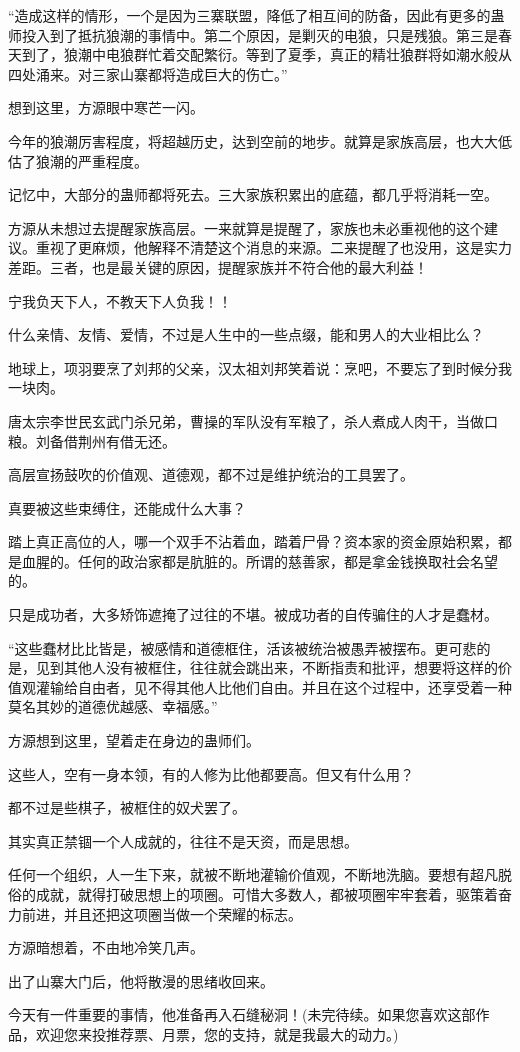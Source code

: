 \begin{this_body}
“造成这样的情形，一个是因为三寨联盟，降低了相互间的防备，因此有更多的蛊师投入到了抵抗狼潮的事情中。第二个原因，是剿灭的电狼，只是残狼。第三是春天到了，狼潮中电狼群忙着交配繁衍。等到了夏季，真正的精壮狼群将如潮水般从四处涌来。对三家山寨都将造成巨大的伤亡。”

想到这里，方源眼中寒芒一闪。

今年的狼潮厉害程度，将超越历史，达到空前的地步。就算是家族高层，也大大低估了狼潮的严重程度。

记忆中，大部分的蛊师都将死去。三大家族积累出的底蕴，都几乎将消耗一空。

方源从未想过去提醒家族高层。一来就算是提醒了，家族也未必重视他的这个建议。重视了更麻烦，他解释不清楚这个消息的来源。二来提醒了也没用，这是实力差距。三者，也是最关键的原因，提醒家族并不符合他的最大利益！

宁我负天下人，不教天下人负我！！

什么亲情、友情、爱情，不过是人生中的一些点缀，能和男人的大业相比么？

地球上，项羽要烹了刘邦的父亲，汉太祖刘邦笑着说：烹吧，不要忘了到时候分我一块肉。

唐太宗李世民玄武门杀兄弟，曹操的军队没有军粮了，杀人煮成人肉干，当做口粮。刘备借荆州有借无还。

高层宣扬鼓吹的价值观、道德观，都不过是维护统治的工具罢了。

真要被这些束缚住，还能成什么大事？

踏上真正高位的人，哪一个双手不沾着血，踏着尸骨？资本家的资金原始积累，都是血腥的。任何的政治家都是肮脏的。所谓的慈善家，都是拿金钱换取社会名望的。

只是成功者，大多矫饰遮掩了过往的不堪。被成功者的自传骗住的人才是蠢材。

“这些蠢材比比皆是，被感情和道德框住，活该被统治被愚弄被摆布。更可悲的是，见到其他人没有被框住，往往就会跳出来，不断指责和批评，想要将这样的价值观灌输给自由者，见不得其他人比他们自由。并且在这个过程中，还享受着一种莫名其妙的道德优越感、幸福感。”

方源想到这里，望着走在身边的蛊师们。

这些人，空有一身本领，有的人修为比他都要高。但又有什么用？

都不过是些棋子，被框住的奴犬罢了。

其实真正禁锢一个人成就的，往往不是天资，而是思想。

任何一个组织，人一生下来，就被不断地灌输价值观，不断地洗脑。要想有超凡脱俗的成就，就得打破思想上的项圈。可惜大多数人，都被项圈牢牢套着，驱策着奋力前进，并且还把这项圈当做一个荣耀的标志。

方源暗想着，不由地冷笑几声。

出了山寨大门后，他将散漫的思绪收回来。

今天有一件重要的事情，他准备再入石缝秘洞！(未完待续。如果您喜欢这部作品，欢迎您来投推荐票、月票，您的支持，就是我最大的动力。)

\end{this_body}

